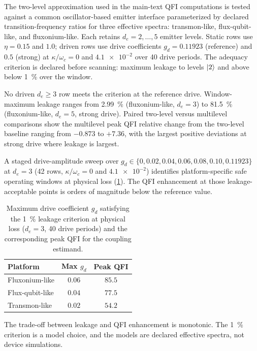 \documentclass[aps,prxquantum,preprint,superscriptaddress,amsmath,amssymb]{revtex4-2}
\begin{document}
The two-level approximation used in the main-text QFI computations is tested against a common oscillator-based emitter interface parameterized by declared transition-frequency ratios for three effective spectra: transmon-like, flux-qubit-like, and fluxonium-like. Each retains $d_e=\num{2},\dots,\num{5}$ emitter levels. Static rows use $\eta=\num{0.15}$ and $\num{1.0}$; driven rows use drive coefficients $g_d=\num{0.11923}$ (reference) and $\num{0.5}$ (strong) at $\kappa/\omega_c=0$ and $\num{4.1e-2}$ over \num{40} drive periods. The adequacy criterion is declared before scanning: maximum leakage to levels $\ket{2}$ and above below \qty{1}{\percent} over the window.

No driven $d_e\ge\num{3}$ row meets the criterion at the reference drive. Window-maximum leakage ranges from \qty{2.99}{\percent} (fluxonium-like, $d_e=\num{3}$) to \qty{81.5}{\percent} (fluxonium-like, $d_e=\num{5}$, strong drive). Paired two-level versus multilevel comparisons show the multilevel peak QFI relative change from the two-level baseline ranging from $-0.873$ to $+7.36$, with the largest positive deviations at strong drive where leakage is largest.

A staged drive-amplitude sweep over $g_d\in\{0,\num{0.02},\num{0.04},\num{0.06},\num{0.08},\num{0.10},\num{0.11923}\}$ at $d_e=\num{3}$ (\num{42} rows, $\kappa/\omega_c=0$ and $\num{4.1e-2}$) identifies platform-specific safe operating windows at physical loss (\cref{tab:si_multilevel_sweep}). The QFI enhancement at those leakage-acceptable points is orders of magnitude below the reference value.

\begin{table}[hbt!]
\centering
\caption{Maximum drive coefficient $g_d$ satisfying the \qty{1}{\percent} leakage criterion at physical loss ($d_e=\num{3}$, \num{40} drive periods) and the corresponding peak QFI for the coupling estimand.}
\label{tab:si_multilevel_sweep}
\begin{tabular}{l c c}
\toprule
{Platform} & {Max $g_d$} & {Peak QFI} \\
\midrule
Fluxonium-like & $\num{0.06}$ & $\num{85.5}$ \\
Flux-qubit-like & $\num{0.04}$ & $\num{77.5}$ \\
Transmon-like & $\num{0.02}$ & $\num{54.2}$ \\
\bottomrule
\end{tabular}
\end{table}

The trade-off between leakage and QFI enhancement is monotonic. The \qty{1}{\percent} criterion is a model choice, and the models are declared effective spectra, not device simulations.
\end{document}
